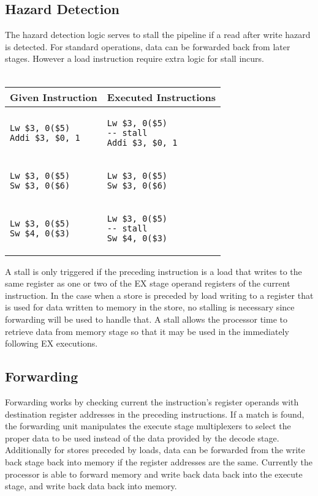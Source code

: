 \documentclass[12pt]{IEEEtran} %
\begin{document}
\subsection{Hazard Detection} %
\label{sub:hazard_detection}
The hazard detection logic serves to stall the pipeline if a read after write hazard is detected. For standard operations, data can be forwarded back from later stages. However a load instruction require extra logic for stall incurs.\\
\\
\begin{tabular}{l l}
    Given Instruction & Executed Instructions\\
    \hline 
    \begin{lstlisting}
Lw $3, 0($5)
Addi $3, $0, 1
    \end{lstlisting} & 
    \begin{lstlisting}
Lw $3, 0($5)
-- stall
Addi $3, $0, 1
    \end{lstlisting} \\
    \hline
    \begin{lstlisting}
Lw $3, 0($5)
Sw $3, 0($6)
    \end{lstlisting} &
    \begin{lstlisting}
Lw $3, 0($5)
Sw $3, 0($6)
    \end{lstlisting}\\
    \hline 
    \begin{lstlisting}
Lw $3, 0($5)
Sw $4, 0($3)
    \end{lstlisting} &
    \begin{lstlisting}
Lw $3, 0($5)
-- stall
Sw $4, 0($3)
    \end{lstlisting} \\
\end{tabular}

A stall is only triggered if the preceding instruction is a load that writes to the same register as one or two of the EX stage operand registers of the current instruction. In the case when a store is preceded by load writing to a register that is used for data written to memory in the store, no stalling is necessary since forwarding will be used to handle that. A stall allows the processor time to retrieve data from memory stage so that it may be used in the immediately following EX executions.

\subsection{Forwarding} %
\label{sub:forwarding}
Forwarding works by checking current the instruction’s register operands with destination register addresses in the preceding instructions. If a match is found, the forwarding unit manipulates the execute stage multiplexers to select the proper data to be used instead of the data provided by the decode stage. Additionally for stores preceded by loads, data can be forwarded from the write back stage back into memory if the register addresses are the same. Currently the processor is able to forward memory and write back data back into the execute stage, and write back data back into memory.
\end{document}
